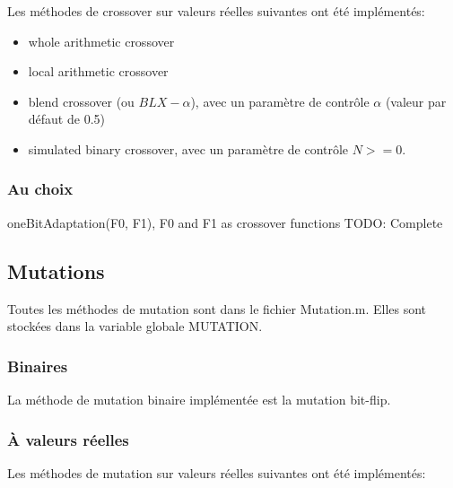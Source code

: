 \documentclass[12pt, letterpaper]{article}
\begin{document}
Les méthodes de crossover sur valeurs réelles suivantes ont été implémentés:

\begin{itemize}
\item whole arithmetic crossover\\
  
\item local arithmetic crossover\\
  
\item blend crossover (ou $BLX-\alpha$), avec un paramètre de contrôle
  $\alpha$ (valeur par défaut de 0.5)\\
  
\item simulated binary crossover, avec un paramètre de contrôle $N >= 0$.\\
\end{itemize}


\subsubsection{Au choix}

oneBitAdaptation(F0, F1), F0 and F1 as crossover functions
TODO: Complete

\subsection{Mutations}

Toutes les méthodes de mutation sont dans le fichier Mutation.m.
Elles sont stockées dans la variable globale MUTATION.

\subsubsection{Binaires}

La méthode de mutation binaire implémentée est la mutation bit-flip.

\subsubsection{À valeurs réelles}

Les méthodes de mutation sur valeurs réelles suivantes ont été implémentés:
\end{document}
